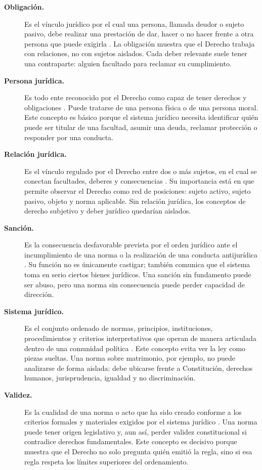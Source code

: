 \documentclass[
	spanish,
	letterpaper, oneside
]{article}
\begin{document}
\begin{description}
\item[\textbf{Obligación.}]
Es el vínculo jurídico por el cual una persona, llamada deudor o sujeto pasivo, debe realizar una prestación de dar, hacer o no hacer frente a otra persona que puede exigirla \citep{poderJudicialGto2007,garciaMaynez2002}. La obligación muestra que el Derecho trabaja con relaciones, no con sujetos aislados. Cada deber relevante suele tener una contraparte: alguien facultado para reclamar su cumplimiento.

\item[\textbf{Persona jurídica.}]
Es todo ente reconocido por el Derecho como capaz de tener derechos y obligaciones \citep{garciaMaynez2002,poderJudicialGto2007}. Puede tratarse de una persona física o de una persona moral. Este concepto es básico porque el sistema jurídico necesita identificar quién puede ser titular de una facultad, asumir una deuda, reclamar protección o responder por una conducta.

\item[\textbf{Relación jurídica.}]
Es el vínculo regulado por el Derecho entre dos o más sujetos, en el cual se conectan facultades, deberes y consecuencias \citep{poderJudicialGto2007,garciaMaynez2002}. Su importancia está en que permite observar el Derecho como red de posiciones: sujeto activo, sujeto pasivo, objeto y norma aplicable. Sin relación jurídica, los conceptos de derecho subjetivo y deber jurídico quedarían aislados.

\item[\textbf{Sanción.}]
Es la consecuencia desfavorable prevista por el orden jurídico ante el incumplimiento de una norma o la realización de una conducta antijurídica \citep{garciaMaynez2002,poderJudicialGto2007}. Su función no es únicamente castigar; también comunica que el sistema toma en serio ciertos bienes jurídicos. Una sanción sin fundamento puede ser abuso, pero una norma sin consecuencia puede perder capacidad de dirección.

\item[\textbf{Sistema jurídico.}]
Es el conjunto ordenado de normas, principios, instituciones, procedimientos y criterios interpretativos que operan de manera articulada dentro de una comunidad política \citep{rojas-gonzalezFilosofiaDerecho2018,garciaMaynez2002}. Este concepto evita ver la ley como piezas sueltas. Una norma sobre matrimonio, por ejemplo, no puede analizarse de forma aislada: debe ubicarse frente a Constitución, derechos humanos, jurisprudencia, igualdad y no discriminación.

\item[\textbf{Validez.}]
Es la cualidad de una norma o acto que ha sido creado conforme a los criterios formales y materiales exigidos por el sistema jurídico \citep{garciaMaynez2002,scjnMatrimonio2015}. Una norma puede tener origen legislativo y, aun así, perder validez constitucional si contradice derechos fundamentales. Este concepto es decisivo porque muestra que el Derecho no solo pregunta quién emitió la regla, sino si esa regla respeta los límites superiores del ordenamiento.

\end{description}
\end{document}
